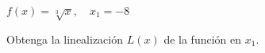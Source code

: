 \item $f(x) = \sqrt[3]{x}, \quad x_1 = -8$
\par
Obtenga la linealización $L(x)$ de la función en $x_1$.
